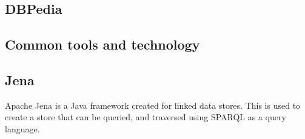 \subsection{DBPedia}

\subsection{Common tools and technology}


\subsection{Jena}
Apache Jena is a Java framework created for linked data stores. This is used to create a store that can be queried, and traversed using SPARQL as a query language.  \\





